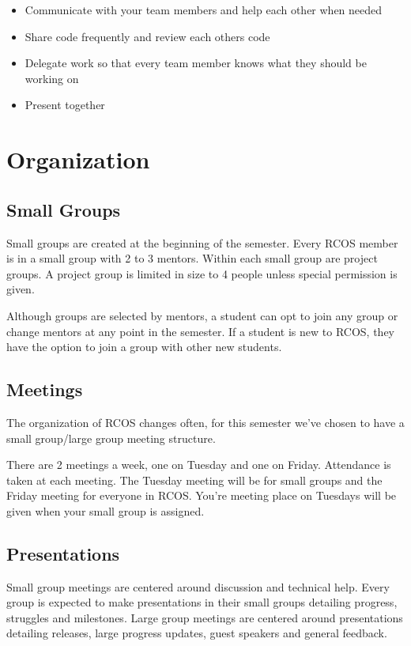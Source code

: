 \documentclass[12pt]{article}
\begin{document}
    \begin{itemize}
        \item Communicate with your team members and help each other when needed
        \item Share code frequently and review each others code
        \item Delegate work so that every team member knows what they should be working on
        \item Present together
    \end{itemize}


    \section{Organization}

    \subsection{Small Groups}

    Small groups are created at the beginning of the semester. Every RCOS member is in a small group with 2 to 3 mentors. Within each small group are project groups. A project group is limited in size to 4 people unless special permission is given.

    Although groups are selected by mentors, a student can opt to join any group or change mentors at any point in the semester. If a student is new to RCOS, they have the option to join a group with other new students.

    \subsection{Meetings}

    The organization of RCOS changes often, for this semester we've chosen to have a small group/large group meeting structure.

    There are 2 meetings a week, one on Tuesday and one on Friday. Attendance is taken at each meeting. The Tuesday meeting will be for small groups and the Friday meeting for everyone in RCOS. You're meeting place on Tuesdays will be given when your small group is assigned.

    \subsection{Presentations}

    Small group meetings are centered around discussion and technical help. Every group is expected to make presentations in their small groups detailing progress, struggles and milestones. Large group meetings are centered around presentations detailing releases, large progress updates, guest speakers and general feedback.
\end{document}
